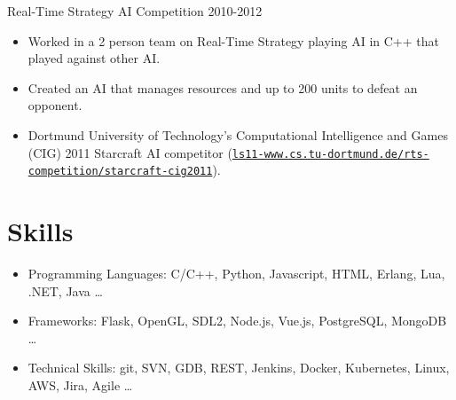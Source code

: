 \documentclass[line,margin]{res}
\begin{document}
\begin{resume}



\vspace{-8pt}
Real-Time Strategy AI Competition
\hfill 2010-2012
\begin{itemize} \itemsep -2pt
	\item Worked in a 2 person team on Real-Time Strategy playing AI in C++ that played against other AI.
	\item Created an AI that manages resources and up to 200 units to defeat an opponent.
	\item Dortmund University of Technology’s Computational Intelligence and Games (CIG) 2011 Starcraft AI
	competitor (\href{http://ls11-www.cs.tu-dortmund.de/rts-competition/starcraft-cig2011}{\texttt{ls11-www.cs.tu-dortmund.de/rts-competition/starcraft-cig2011}}).
\end{itemize}

\vspace{-4pt}
\section{Skills}
\vspace{22pt}
	\begin{itemize} \itemsep -2pt
		\item Programming Languages: C/C++, Python, Javascript, HTML, Erlang, Lua, .NET, Java \ldots
		\item Frameworks: Flask, OpenGL, SDL2, Node.js, Vue.js, PostgreSQL, MongoDB \ldots
		\item Technical Skills: git, SVN, GDB, REST, Jenkins, Docker, Kubernetes, Linux, AWS, Jira, Agile \ldots
	\end{itemize}


\end{resume}
\end{document}
